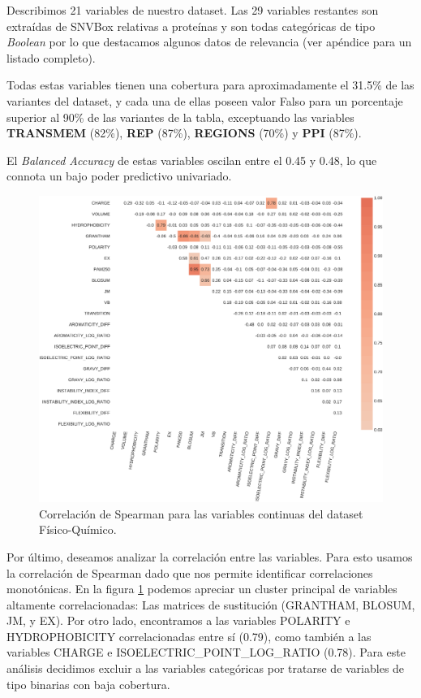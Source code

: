 Describimos 21 variables de nuestro dataset. Las 29 variables restantes son extraídas de SNVBox relativas a proteínas y son todas categóricas de tipo \textit{Boolean} por lo que destacamos algunos datos de relevancia (ver apéndice para un listado completo). 


Todas estas variables tienen una cobertura para aproximadamente el 31.5\% de las variantes del dataset, y cada una de ellas poseen valor Falso para un porcentaje superior al 90\% de las variantes de la tabla, exceptuando las variables \textbf{TRANSMEM} (82\%), \textbf{REP} (87\%), \textbf{REGIONS} (70\%) y \textbf{PPI} (87\%). 

El \textit{Balanced Accuracy} de estas variables oscilan entre el 0.45 y 0.48, lo que connota un bajo poder predictivo univariado.

\newpage

\begin{figure}[H]
    \centering
    \includegraphics[scale=0.25]{documents/latex/figures/3/structural/structural_corr.pdf}
    \caption{Correlación de Spearman para las variables continuas del dataset Físico-Químico.}
    \label{fig:corrplot_structural}
\end{figure}

Por último, deseamos analizar la correlación entre las variables. Para esto usamos la correlación de Spearman dado que nos permite identificar correlaciones monotónicas. En la figura \ref{fig:corrplot_structural} podemos apreciar un cluster principal de variables altamente correlacionadas: Las matrices de sustitución (GRANTHAM, BLOSUM, JM, y EX). Por otro lado, encontramos a las variables POLARITY e HYDROPHOBICITY correlacionadas entre sí (0.79), como también a las variables CHARGE e ISOELECTRIC\_POINT\_LOG\_RATIO (0.78). Para este análisis decidimos excluir a las variables categóricas por tratarse de variables de tipo binarias con baja cobertura. 


